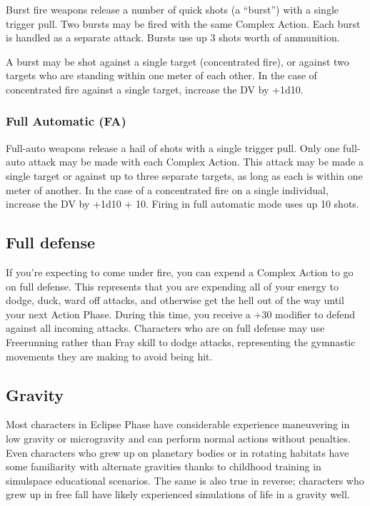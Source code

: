 Burst fire weapons release a number of quick shots (a ``burst”) with a single trigger pull. Two bursts may be fired with the same Complex Action. Each burst is handled as a separate attack. Bursts use up 3 shots worth of ammunition.

A burst may be shot against a single target (concentrated fire), or against two targets who are standing within one meter of each other. In the case of concentrated fire against a single target, increase the DV by +1d10.

\subsubsection{Full Automatic (FA)}

Full-auto weapons release a hail of shots with a single trigger pull. Only one full-auto attack may be made with each Complex Action. This attack may be made a single target or against up to three separate targets, as long as each is within one meter of another. In the case of a concentrated fire on a single individual, increase the DV by +1d10 + 10. Firing in full automatic mode uses up 10 shots.


\subsection{Full defense}
\label{sec:full-defense}

If you’re expecting to come under fire, you can expend a Complex Action to go on full defense. This represents that you are expending all of your energy to dodge, duck, ward off attacks, and otherwise get the hell out of the way until your next Action Phase. During this time, you receive a +30 modifier to defend against all incoming attacks. Characters who are on full defense may use Freerunning rather than Fray skill to dodge attacks, representing the gymnastic movements they are making to avoid being hit.

\subsection{Gravity}
\label{sec:gravity}

Most characters in Eclipse Phase have considerable experience maneuvering in low gravity or microgravity and can perform normal actions without penalties. Even characters who grew up on planetary bodies or in rotating habitats have some familiarity with alternate gravities thanks to childhood training in simulspace educational scenarios. The same is also true in reverse; characters who grew up in free fall have likely experienced simulations of life in a gravity well.

